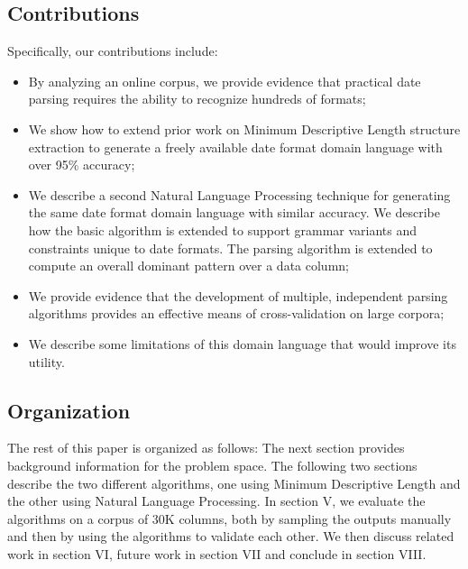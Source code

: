 \subsection{Contributions}

Specifically, our contributions include:
\begin{itemize}
\item By analyzing an online corpus, we provide evidence that practical date parsing requires the ability to recognize hundreds of formats;
\item We show how to extend prior work on Minimum Descriptive Length structure extraction to generate a freely available date format domain language with over 95\% accuracy;
\item We describe a second Natural Language Processing technique for generating the same date format domain language with similar accuracy. We describe how the basic algorithm is extended to support grammar variants and constraints unique to date formats. The parsing algorithm is extended to compute an overall dominant pattern over a data column;
\item We provide evidence that the development of multiple, independent parsing algorithms provides an effective means of cross-validation on large corpora;
\item We describe some limitations of this domain language that would improve its utility.
\end{itemize}

\subsection{Organization}
The rest of this paper is organized as follows: The next section provides background information for the problem space. The following two sections describe the two different algorithms, one using Minimum Descriptive Length and the other using Natural Language Processing. In section V, we evaluate the algorithms on a corpus of 30K columns, both by sampling the outputs manually and then by using the algorithms to validate each other. We then discuss related work in section VI, future work in section VII and conclude in section VIII.
